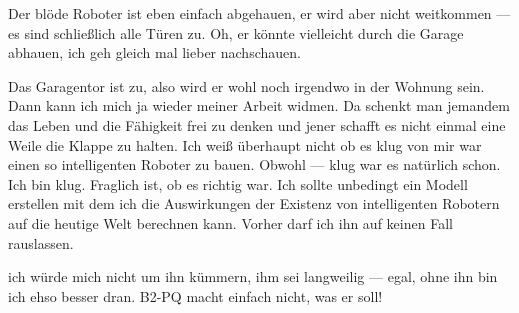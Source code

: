 Der blöde Roboter ist eben einfach abgehauen, er wird aber nicht weitkommen — es sind schließlich alle Türen zu. Oh, er könnte vielleicht durch die Garage abhauen, ich geh gleich mal lieber nachschauen.
 
Das Garagentor ist zu, also wird er wohl noch irgendwo in der Wohnung sein. Dann kann ich mich ja wieder meiner Arbeit widmen. Da schenkt man jemandem das Leben und die Fähigkeit frei zu denken und jener schafft es nicht einmal eine Weile die Klappe zu halten. Ich weiß überhaupt nicht ob es klug von mir war einen so intelligenten Roboter zu bauen. Obwohl — klug war es natürlich schon. Ich bin klug. Fraglich ist, ob es richtig war. Ich sollte unbedingt ein Modell erstellen mit dem ich die Auswirkungen der Existenz von intelligenten Robotern auf die heutige Welt berechnen kann. Vorher darf ich ihn auf keinen Fall rauslassen. %


ich würde mich nicht um ihn kümmern, ihm sei langweilig — egal, ohne ihn bin ich ehso besser dran. B2-PQ macht einfach nicht, was er soll! 
